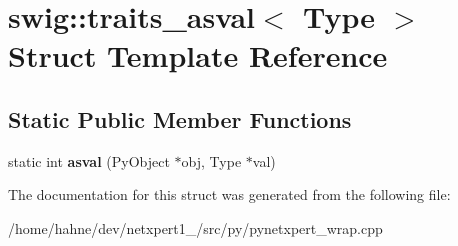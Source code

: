\hypertarget{structswig_1_1traits__asval}{}\section{swig\+:\+:traits\+\_\+asval$<$ Type $>$ Struct Template Reference}
\label{structswig_1_1traits__asval}
\subsection*{Static Public Member Functions}
\begin{DoxyCompactItemize}
\item 
static int {\bfseries asval} (Py\+Object $\ast$obj, Type $\ast$val)\hypertarget{structswig_1_1traits__asval_a5d0ee3dd0c23458db2aeae93d8c02bc0}{}\label{structswig_1_1traits__asval_a5d0ee3dd0c23458db2aeae93d8c02bc0}

\end{DoxyCompactItemize}


The documentation for this struct was generated from the following file\+:\begin{DoxyCompactItemize}
\item 
/home/hahne/dev/netxpert1\+\_/src/py/pynetxpert\+\_\+wrap.\+cpp\end{DoxyCompactItemize}
